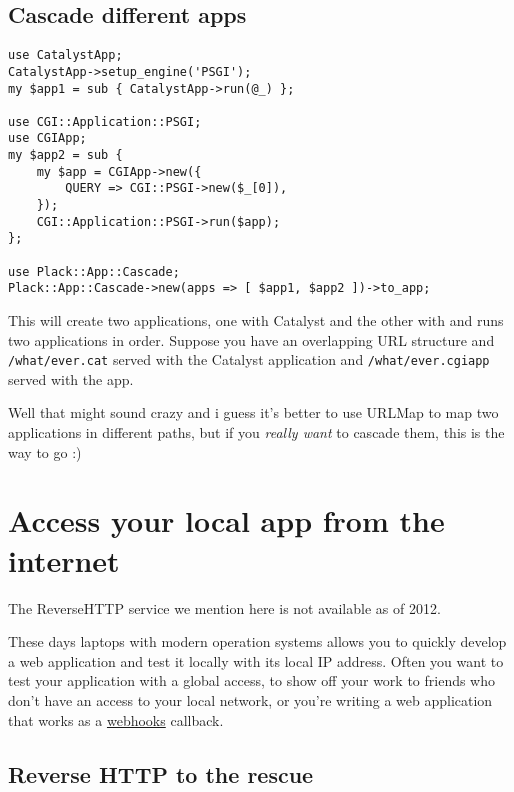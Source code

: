 \section{Cascade different apps}\label{cascade-different-apps}

\begin{lstlisting}
use CatalystApp;
CatalystApp->setup_engine('PSGI');
my $app1 = sub { CatalystApp->run(@_) };

use CGI::Application::PSGI;
use CGIApp;
my $app2 = sub {
    my $app = CGIApp->new({
        QUERY => CGI::PSGI->new($_[0]),
    });
    CGI::Application::PSGI->run($app);
};

use Plack::App::Cascade;
Plack::App::Cascade->new(apps => [ $app1, $app2 ])->to_app;
\end{lstlisting}

This will create two applications, one with Catalyst and the other with
 and runs two applications in order. Suppose you have an
overlapping URL structure and \lstinline!/what/ever.cat! served with the
Catalyst application and \lstinline!/what/ever.cgiapp! served with the
 app.

Well that might sound crazy and i guess it's better to use URLMap to map
two applications in different paths, but if you \emph{really want} to
cascade them, this is the way to go :)

\chapter{Access your local app from the
internet}\label{day-20-access-your-local-app-from-the-internet}

\begin{note}
  The ReverseHTTP service we mention here is not available as of 2012.
\end{note}

These days laptops with modern operation systems allows you to quickly
develop a web application and test it locally with its local IP address.
Often you want to test your application with a global access, to show
off your work to friends who don't have an access to your local network,
or you're writing a web application that works as a
\href{http://www.webhooks.org/}{webhooks} callback.

\section{Reverse HTTP to the
rescue}\label{reverse-http-to-the-rescue}

